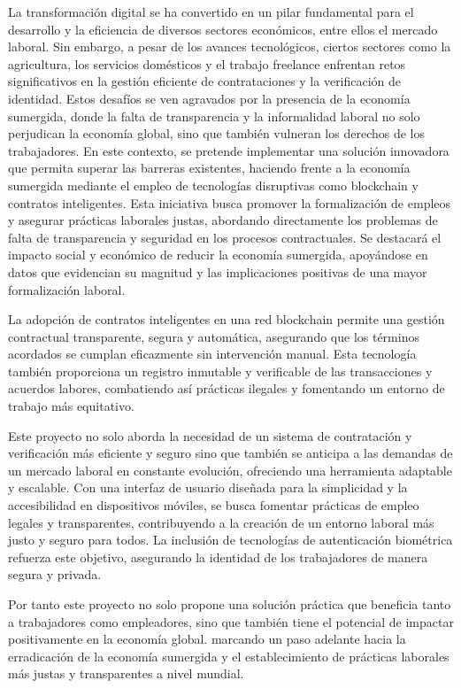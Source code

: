 
La transformación digital se ha convertido en un pilar fundamental para el desarrollo y la eficiencia de diversos sectores económicos, entre ellos el mercado laboral. Sin embargo, a pesar de los avances tecnológicos, ciertos sectores como la agricultura, los servicios domésticos y el trabajo freelance enfrentan retos significativos en la gestión eficiente de contrataciones y la verificación de identidad.
Estos desafíos se ven agravados por la presencia de la economía sumergida, donde la falta de transparencia y la informalidad laboral no solo perjudican la economía global, sino que también vulneran los derechos de los trabajadores.
En este contexto, se pretende implementar una solución innovadora que permita superar las barreras existentes, haciendo frente a la economía sumergida mediante el empleo de tecnologías disruptivas como blockchain y contratos inteligentes. Esta iniciativa busca promover la formalización de empleos y asegurar prácticas laborales justas, abordando directamente los problemas de falta de transparencia y seguridad en los procesos contractuales. Se destacará el impacto social y económico de reducir la economía sumergida, apoyándose en datos que evidencian su magnitud y las implicaciones positivas de una mayor formalización laboral.

La adopción de contratos inteligentes en una red blockchain permite una gestión contractual transparente, segura y automática, asegurando que los términos acordados se cumplan eficazmente sin intervención manual.
Esta tecnología también proporciona un registro inmutable y verificable de las transacciones y acuerdos labores, combatiendo así prácticas ilegales y fomentando un entorno de trabajo más equitativo.

Este proyecto no solo aborda la necesidad de un sistema de contratación y verificación más eficiente y seguro sino que también se anticipa a las demandas de un mercado laboral en constante evolución, ofreciendo una herramienta adaptable y escalable. Con una interfaz de usuario diseñada para la simplicidad y la accesibilidad en dispositivos móviles, se busca fomentar prácticas de empleo legales y transparentes, contribuyendo a la creación de un entorno laboral más justo y seguro para todos.
La inclusión de tecnologías de autenticación biométrica refuerza este objetivo, asegurando la identidad de los trabajadores de manera segura y privada.

Por tanto este proyecto no solo propone una solución práctica que beneficia tanto a trabajadores como empleadores, sino que también tiene el potencial de impactar positivamente en la economía global. marcando un paso adelante hacia la erradicación de la economía sumergida y el establecimiento de prácticas laborales más justas y transparentes a nivel mundial.